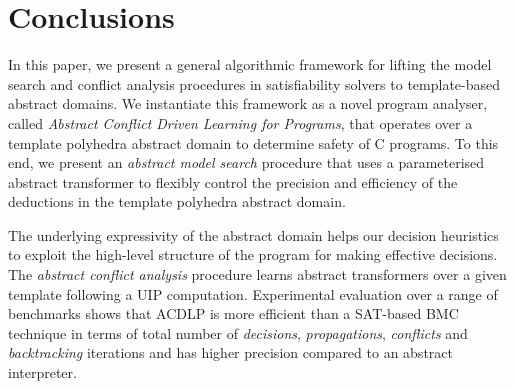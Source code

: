 \section{Conclusions}
In this paper, we present a general algorithmic framework for lifting 
the model search and conflict analysis procedures in satisfiability 
solvers to template-based abstract domains.  We instantiate this framework 
as a novel program analyser, called {\em Abstract Conflict Driven Learning 
for Programs}, that operates over a template polyhedra abstract domain to 
determine safety of C programs. To this end, we present an {\em abstract 
model search} procedure that uses a parameterised abstract transformer 
to flexibly control the precision and efficiency of the deductions in 
the template polyhedra abstract domain. 

%
The underlying expressivity of the abstract domain helps our decision 
heuristics to exploit the high-level structure of the program for making 
effective decisions.  The {\em abstract conflict analysis} procedure learns 
abstract transformers over a given template following a UIP computation.
%
Experimental evaluation over a range of benchmarks shows that ACDLP is 
more efficient than a SAT-based BMC technique in terms of total number of 
{\em decisions}, {\em propagations}, {\em conflicts} and {\em backtracking} 
iterations and has higher precision compared to an abstract interpreter.

